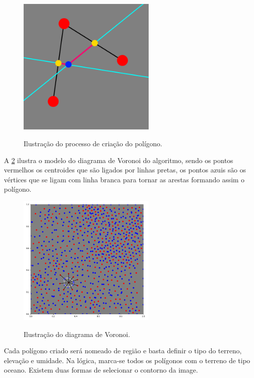 \begin{figure}[!ht]
	\centering
    \caption{Ilustração do processo de criação do polígono.}
	\includegraphics[width=0.6\textwidth]{figures/explicacao_vertice.png}
	\label{fig:explicacao_vertice}
\end{figure}

A \cref{fig:diagrama_voronoi_pontos} ilustra o modelo do diagrama de Voronoi do algoritmo, sendo os pontos vermelhos os centroides que são ligados por linhas pretas, os pontos azuis são os vértices que se ligam com linha branca para tornar as arestas formando assim o polígono.

\begin{figure}[!ht]
	\centering
    \caption{Ilustração do diagrama de Voronoi.}
	\includegraphics[width=0.6\textwidth]{figures/diagrama_voronoi_pontos.png}
	\label{fig:diagrama_voronoi_pontos}
\end{figure}

Cada polígono criado será nomeado de região e basta definir o tipo do terreno, elevação e umidade. Na lógica, marca-se todos os polígonos com o terreno de tipo oceano. Existem duas formas de selecionar o contorno da image.

